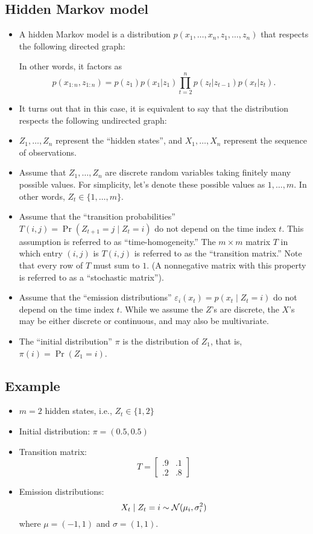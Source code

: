 \documentclass[12pt]{article}
\begin{document}
\subsection{Hidden Markov model}
\begin{itemize}
\item A hidden Markov model is a distribution $p(x_1,\ldots,x_n,z_1,\ldots,z_n)$ that respects the following directed graph:

In other words, it factors as
$$ p(x_{1:n},z_{1:n}) =p(z_1) p(x_1 | z_1) \prod_{t = 2}^n p(z_ t | z_{t -1}) p(x_t | z_t). $$
\item It turns out that in this case, it is equivalent to say that the distribution respects the following undirected graph:

\item $Z_1,\ldots,Z_n$ represent the ``hidden states'', and $X_1,\ldots,X_n$ represent the sequence of observations.
\item Assume that $Z_1,\ldots,Z_n$ are discrete random variables taking finitely many possible values. For simplicity, let's denote these possible values as $1,\ldots,m$. In other words, $Z_t \in \{1,\ldots,m \}$.
\item Assume that the ``transition probabilities'' $T(i,j) = \Pr(Z_{t +1} = j \mid Z_t = i)$ do not depend on the time index $t$. This assumption is referred to as ``time-homogeneity.'' The $m \times m$  matrix $T$ in which entry $(i,j)$ is $T(i,j)$ is referred to as the ``transition matrix.'' Note that every row of $T$ must sum to $1$. (A nonnegative matrix with this property is referred to as a ``stochastic matrix'').
\item Assume that the ``emission distributions'' $\varepsilon_i(x_t) = p(x_t \mid Z_t = i)$ do not depend on the time index $t$. While we assume the $Z$'s are discrete, the $X$'s may be either discrete or continuous, and may also be multivariate.
\item The ``initial distribution'' $\pi$ is the distribution of $Z_1$, that is, $\pi(i) = \Pr(Z_1 = i)$.
\end{itemize}

\subsection{Example}
\begin{itemize}
\item $m = 2$ hidden states, i.e., $Z_t \in \{1,2 \}$
\item Initial distribution: $\pi = (0.5, 0.5)$
\item Transition matrix:
$$ T = \begin{bmatrix}.9 & .1\\.2 & .8 \end{bmatrix} $$
\item Emission distributions: 
$$X_t \mid Z_t = i \sim \mathcal{N}(\mu_i,\sigma_i^2)$$
where $\mu = (-1,1)$ and $\sigma = (1,1)$.
\end{itemize}
\end{document}

